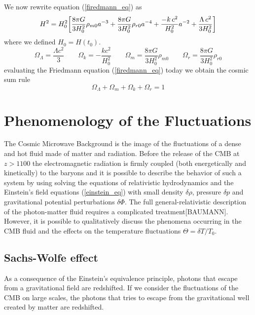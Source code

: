\documentclass{article}
\newcommand{\beq}{\begin{equation}}
\newcommand{\eeq}{\end{equation}}
\begin{document}
We now rewrite equation (\ref{firedmann_eq}) as
\begin{equation}
H ^2 = H_0 ^2 \qty[
\dfrac{8 \pi G}{3 H_0 ^2} \rho_{m 0} a^{-3}+
\dfrac{8 \pi G}{3 H_0 ^2} \rho_{r 0} a^{-4}+ 
\dfrac{-k \, c^2}{H_0 ^2} a^{-2} + \dfrac{\Lambda \, c^2}{3 H_0 ^2}
] \notag
\end{equation}
where we defined $H_0 = H(t_0)$.\\
\beq
\Omega_\Lambda = \dfrac{\Lambda c^2}{3} \qquad \Omega_k = -  \dfrac{k c^2}{H_0 ^2} \qquad
\Omega_m = \dfrac{8 \pi G}{3 H_0 ^2} \rho_{m 0} \qquad \Omega_r =\dfrac{8 \pi G}{3 H_0 ^2} \rho_{r 0}
\eeq
evaluating the Friedmann equation (\ref{firedmann_eq}) today we obtain the cosmic sum rule
\begin{equation}
\label{cosmic_rule}
\Omega_{\Lambda} + \Omega_{m} + \Omega_k + \Omega_{r} = 1
\end{equation}







\section{Phenomenology of the Fluctuations}
The Cosmic Microwave Background is the image of the fluctuations of a dense and hot fluid made of matter and radiation.
Before the release of the CMB at $z > 1100$ the electromagnetic radiation is firmly coupled (both energetically and kinetically) to the baryons and it is possible to describe the behavior of such a system by using solving the equations of relativistic hydrodynamics and the Einstein's field equations (\ref{einstein_eq}) with small density $\delta \rho$, pressure $\delta p$ and gravitational potential perturbations $\delta \Phi$.
The full general-relativistic description of the photon-matter fluid requires a complicated treatment[BAUMANN].
However, it is possible to qualitatively discuss the phenomena occurring in the CMB fluid and the effects on the temperature fluctuations $\Theta = \delta T / T_0$.
\subsection{Sachs-Wolfe effect}
As a consequence of the Einstein's equivalence principle, photons that escape from a gravitational field are redshifted.
If we consider the fluctuations of the CMB on large scales, the photons that tries to escape from the gravitational well created by matter are redshifted.
\end{document}
